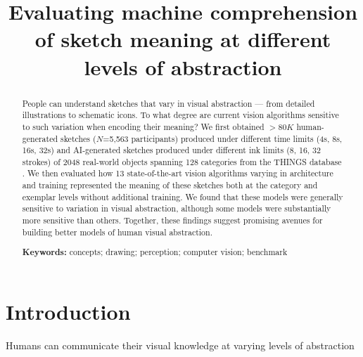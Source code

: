 \documentclass[10pt,letterpaper]{article}
\title{Evaluating machine comprehension of sketch meaning at different levels of abstraction}
\begin{document}
\makeatletter
\let\@oldmaketitle\@maketitle%


\makeatother
\maketitle

\begin{abstract}

People can understand sketches that vary in visual abstraction --- from detailed illustrations to schematic icons. 
To what degree are current vision algorithms sensitive to such variation when encoding their meaning? 
We first obtained $>80K$ human-generated sketches ($N$=5,563 participants) produced under different time limits (4s, 8s, 16s, 32s) and AI-generated sketches \cite{vinker2022clipasso} produced under different ink limits (8, 16, 32 strokes)  of 2048 real-world objects spanning 128 categories from the THINGS database \cite{hebart2019things}.
We then evaluated how 13 state-of-the-art vision algorithms varying in architecture and training represented the meaning of these sketches both at the category and exemplar levels without additional training.
We found that these models were generally sensitive to variation in visual abstraction, although some models were substantially more sensitive than others.
Together, these findings suggest promising avenues for building better models of human visual abstraction. 

\textbf{Keywords:} 
concepts; drawing; perception; computer vision; benchmark
\end{abstract}


\section{Introduction}
Humans can communicate their visual knowledge at varying levels of abstraction
\end{document}
